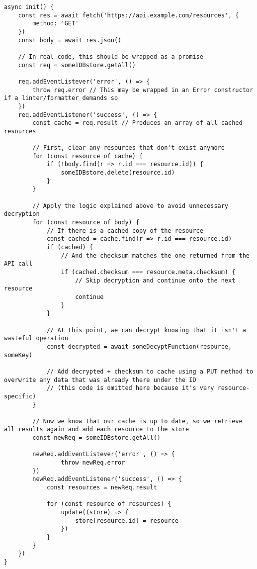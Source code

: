 \documentclass{article}
\begin{document}
\begin{lstlisting}[caption=Retrieving Encrypted Resources]
async init() {
    const res = await fetch('https://api.example.com/resources', {
        method: 'GET'
    })
    const body = await res.json()
    
    // In real code, this should be wrapped as a promise
    const req = someIDBstore.getAll()
    
    req.addEventListever('error', () => {
        throw req.error // This may be wrapped in an Error constructor if a linter/formatter demands so
    })
    req.addEventListener('success', () => {
        const cache = req.result // Produces an array of all cached resources
        
        // First, clear any resources that don't exist anymore
        for (const resource of cache) {
            if (!body.find(r => r.id === resource.id)) {
                someIDBstore.delete(resource.id)
            }
        }
        
        // Apply the logic explained above to avoid unnecessary decryption
        for (const resource of body) {
            // If there is a cached copy of the resource
            const cached = cache.find(r => r.id === resource.id)
            if (cached) {
                // And the checksum matches the one returned from the API call
                if (cached.checksum === resource.meta.checksum) {
                    // Skip decryption and continue onto the next resource
                    continue
                }
            }
            
            // At this point, we can decrypt knowing that it isn't a wasteful operation
            const decrypted = await someDecyptFunction(resource, someKey)
            
            // Add decrypted + checksum to cache using a PUT method to overwrite any data that was already there under the ID
            // (this code is omitted here because it's very resource-specific)
        }
        
        // Now we know that our cache is up to date, so we retrieve all results again and add each resource to the store
        const newReq = someIDBstore.getAll()
        
        newReq.addEventListever('error', () => {
                throw newReq.error
        })
        newReq.addEventListener('success', () => {
            const resources = newReq.result
            
            for (const resource of resources) {
                update((store) => {
                    store[resource.id] = resource
                })
            }
        }
    })
}
\end{lstlisting}
\end{document}
